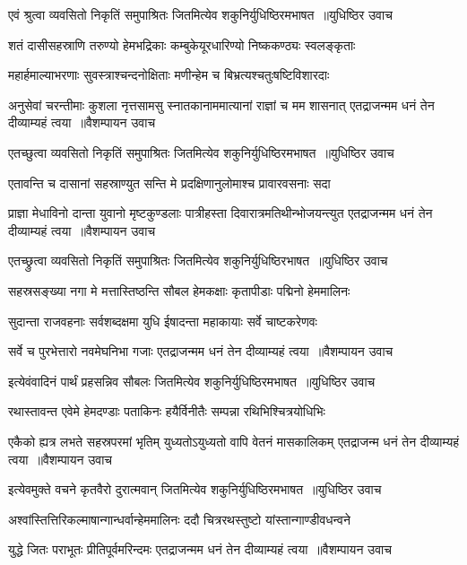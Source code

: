 \twolineshloka
{एवं श्रुत्वा व्यवसितो निकृतिं समुपाश्रितः}
{जितमित्येव शकुनिर्युधिष्ठिरमभाषत ॥युधिष्ठिर उवाच}


\twolineshloka
{शतं दासीसहस्राणि तरुण्यो हेमभद्रिकाः}
{कम्बुकेयूरधारिण्यो निष्ककण्ठ्यः स्वलङ्कृताः}


\twolineshloka
{महार्हमाल्याभरणाः सुवस्त्राश्चन्दनोक्षिताः}
{मणीन्हेम च बिभ्रत्यश्चतुःषष्टिविशारदाः}


\threelineshloka
{अनुसेवां चरन्तीमाः कुशला नृत्तसामसु}
{स्नातकानाममात्यानां राज्ञां च मम शासनात्}
{एतद्राजन्मम धनं तेन दीव्याम्यहं त्वया ॥वैशम्पायन उवाच}


\threelineshloka
{एतच्छुत्वा व्यवसितो निकृतिं समुपाश्रितः}
{जितमित्येव शकुनिर्युधिष्ठिरमभाषत ॥युधिष्ठिर उवाच}
{}


\twolineshloka
{एतावन्ति च दासानां सहस्राण्युत सन्ति मे}
{प्रदक्षिणानुलोमाश्च प्रावारवसनाः सदा}


\threelineshloka
{प्राज्ञा मेधाविनो दान्ता युवानो मृष्टकुण्डलाः}
{पात्रीहस्ता दिवारात्रमतिथीन्भोजयन्त्युत}
{एतद्राजन्मम धनं तेन दीव्याम्यहं त्वया ॥वैशम्पायन उवाच}


\twolineshloka
{एतच्छ्रुत्वा व्यवसितो निकृतिं समुपाश्रितः}
{जितमित्येव शकुनिर्युधिष्ठिरभाषत ॥युधिष्ठिर उवाच}


\twolineshloka
{सहस्रसङ्ख्या नगा मे मत्तास्तिष्ठन्ति सौबल}
{हेमकक्षाः कृतापीडाः पद्मिनो हेममालिनः}


\twolineshloka
{सुदान्ता राजवहनाः सर्वशब्दक्षमा युधि}
{ईषादन्ता महाकायाः सर्वे चाष्टकरेणवः}


\twolineshloka
{सर्वे च पुरभेत्तारो नवमेघनिभा गजाः}
{एतद्राजन्मम धनं तेन दीव्याम्यहं त्वया ॥वैशम्पायन उवाच}


\twolineshloka
{इत्येवंवादिनं पार्थं प्रहसन्निव सौबलः}
{जितमित्येव शकुनिर्युधिष्ठिरमभाषत ॥युधिष्ठिर उवाच}


\twolineshloka
{रथास्तावन्त एवेमे हेमदण्डाः पताकिनः}
{हयैर्विनीतैः सम्पन्ना रथिभिश्चित्रयोधिभिः}


\threelineshloka
{एकैको ह्यत्र लभते सहस्रपरमां भृतिम्}
{युध्यतोऽयुध्यतो वापि वेतनं मासकालिकम्}
{एतद्राजन्म धनं तेन दीव्याम्यहं त्वया ॥वैशम्पायन उवाच}


\twolineshloka
{इत्येवमुक्ते वचने कृतवैरो दुरात्मवान्}
{जितमित्येव शकुनिर्युधिष्ठिरमभाषत ॥युधिष्ठिर उवाच}


\twolineshloka
{अश्वांस्तित्तिरिकल्माषान्गान्धर्वान्हेममालिनः}
{ददौ चित्ररथस्तुष्टो यांस्तान्गाण्डीवधन्वने}


\twolineshloka
{युद्धे जितः पराभूतः प्रीतिपूर्वमरिन्दमः}
{एतद्राजन्मम धनं तेन दीव्याम्यहं त्वया ॥वैशम्पायन उवाच}



